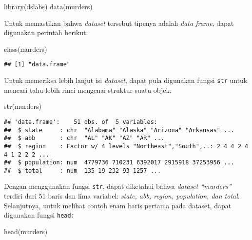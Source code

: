 \documentclass[
]{article}
\newenvironment{Shaded}{\begin{snugshade}}{\end{snugshade}}
\newcommand{\FunctionTok}[1]{\textcolor[rgb]{0.00,0.00,0.00}{#1}}
\newcommand{\NormalTok}[1]{#1}
\begin{document}
\begin{Shaded}
\begin{Highlighting}[]
\FunctionTok{library}\NormalTok{(dslabs) }
\FunctionTok{data}\NormalTok{(murders)}
\end{Highlighting}
\end{Shaded}

Untuk memastikan bahwa \emph{dataset} tersebut tipenya adalah \emph{data
frame}, dapat digunakan perintah berikut:

\begin{Shaded}
\begin{Highlighting}[]
\FunctionTok{class}\NormalTok{(murders) }
\end{Highlighting}
\end{Shaded}

\begin{verbatim}
## [1] "data.frame"
\end{verbatim}

Untuk memeriksa lebih lanjut isi \emph{dataset}, dapat pula digunakan
fungsi \texttt{str} untuk mencari tahu lebih rinci mengenai struktur
suatu objek:

\begin{Shaded}
\begin{Highlighting}[]
\FunctionTok{str}\NormalTok{(murders)}
\end{Highlighting}
\end{Shaded}

\begin{verbatim}
## 'data.frame':    51 obs. of  5 variables:
##  $ state     : chr  "Alabama" "Alaska" "Arizona" "Arkansas" ...
##  $ abb       : chr  "AL" "AK" "AZ" "AR" ...
##  $ region    : Factor w/ 4 levels "Northeast","South",..: 2 4 4 2 4 4 1 2 2 2 ...
##  $ population: num  4779736 710231 6392017 2915918 37253956 ...
##  $ total     : num  135 19 232 93 1257 ...
\end{verbatim}

Dengan menggunakan fungsi \texttt{str}, dapat diketahui bahwa
\emph{dataset ``murders''} terdiri dari 51 baris dan lima variabel:
\emph{state, abb, region, population, dan total}. Selanjutnya, untuk
melihat contoh enam baris pertama pada dataset, dapat digunakan fungsi
\texttt{head:}

\begin{Shaded}
\begin{Highlighting}[]
\FunctionTok{head}\NormalTok{(murders)}
\end{Highlighting}
\end{Shaded}
\end{document}
